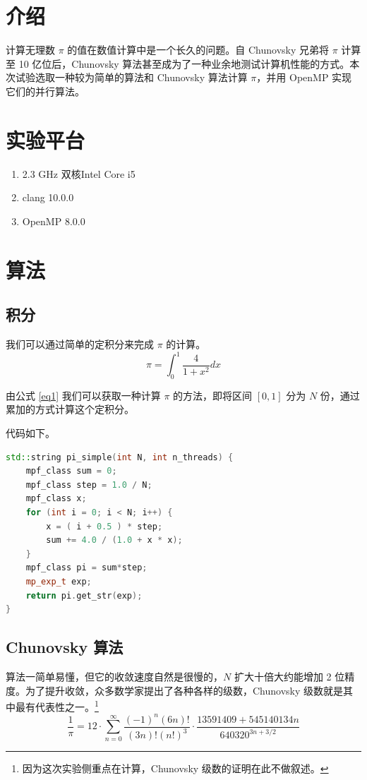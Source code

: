 \documentclass{zjureport-zh}
\begin{document}
\makecover

\section{介绍}
\par 计算无理数 $\pi$ 的值在数值计算中是一个长久的问题。自 Chunovsky 兄弟将 $\pi$ 计算至 10 亿位后，Chunovsky 算法甚至成为了一种业余地测试计算机性能的方式。本次试验选取一种较为简单的算法和 Chunovsky 算法计算 $\pi$，并用 OpenMP 实现它们的并行算法。

\section{实验平台}
\begin{enumerate}[label=(\arabic*)]
	\item 2.3 GHz 双核Intel Core i5
	\item clang 10.0.0
	\item OpenMP 8.0.0
\end{enumerate}

\section{算法}
\subsection{积分}
\par 我们可以通过简单的定积分来完成 $\pi$ 的计算。
\begin{equation}
	\pi = \int_0^1 \frac{4}{1+x^2} dx \label{eq1}
\end{equation}

\par 由公式 \ref{eq1} 我们可以获取一种计算 $\pi$ 的方法，即将区间 $[0, 1]$ 分为 $N$ 份，通过累加的方式计算这个定积分。
\par 代码如下。
\begin{lstlisting}[language=c++]
std::string pi_simple(int N, int n_threads) {
	mpf_class sum = 0;
	mpf_class step = 1.0 / N;
	mpf_class x;
	for (int i = 0; i < N; i++) {
		x = ( i + 0.5 ) * step;
		sum += 4.0 / (1.0 + x * x);
	}
	mpf_class pi = sum*step;
	mp_exp_t exp;
	return pi.get_str(exp);
}
\end{lstlisting}


\subsection{Chunovsky 算法}
\par 算法一简单易懂，但它的收敛速度自然是很慢的，$N$ 扩大十倍大约能增加 2 位精度。为了提升收敛，众多数学家提出了各种各样的级数，Chunovsky 级数就是其中最有代表性之一。\footnote{因为这次实验侧重点在计算，Chunovsky 级数的证明在此不做叙述。}
\begin{equation}
	\frac{1}{\pi} = 12\cdot\sum\limits_{n=0}^{\infty} \frac{(-1)^n(6n)!}{(3n)!(n!)^3} \cdot \frac{13591409+545140134n}{640320^{3n+3/2}} \label{eq2}
\end{equation}
\end{document}
